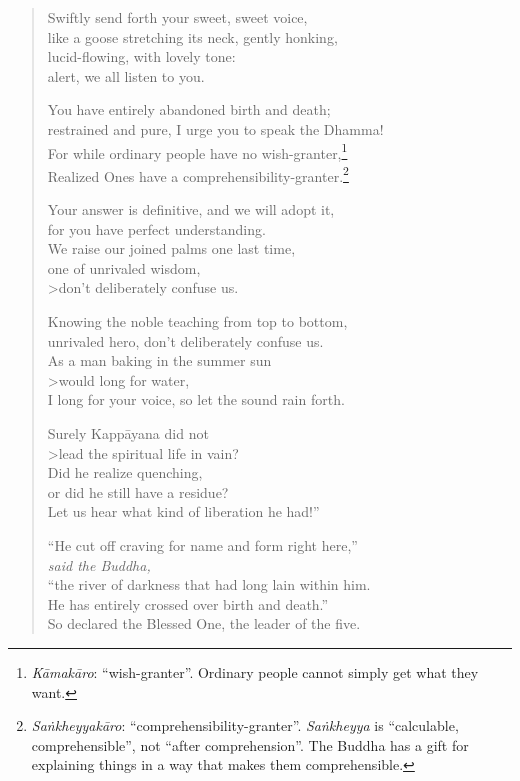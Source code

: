 \documentclass[12pt,openany]{book}%
\newcommand*{\scspeaker}[1]{\hspace{2em}\textit{#1}}
\begin{document}
\begin{verse}
Swiftly send forth your sweet, sweet voice, \\
like a goose stretching its neck, gently honking, \\
lucid-flowing, with lovely tone: \\
alert, we all listen to you. 

You have entirely abandoned birth and death; \\
restrained and pure, I urge you to speak the Dhamma! \\
For while ordinary people have no wish-granter,\footnote{\textit{\textsanskrit{Kāmakāro}}: “wish-granter”. Ordinary people cannot simply get what they want. } \\
Realized Ones have a comprehensibility-granter.\footnote{\textit{\textsanskrit{Saṅkheyyakāro}}: “comprehensibility-granter”. \textit{\textsanskrit{Saṅkheyya}} is “calculable, comprehensible”, not “after comprehension”. The Buddha has a gift for explaining things in a way that makes them comprehensible. } 

Your answer is definitive, and we will adopt it, \\
for you have perfect understanding. \\
We raise our joined palms one last time, \\
one of unrivaled wisdom, \\>don’t deliberately confuse us. 

Knowing the noble teaching from top to bottom, \\
unrivaled hero, don’t deliberately confuse us. \\
As a man baking in the summer sun \\>would long for water, \\
I long for your voice, so let the sound rain  forth. 

Surely \textsanskrit{Kappāyana} did not \\>lead the spiritual life in vain? \\
Did he realize quenching, \\
or did he still have a residue? \\
Let us hear what kind of liberation he had!” 

“He cut off craving for name and form right here,” \\
\scspeaker{said the Buddha, }\\
“the river of darkness that had long lain within him. \\
He has entirely crossed over birth and death.” \\
So declared the Blessed One, the leader of the five. 


\end{verse}
\end{document}
